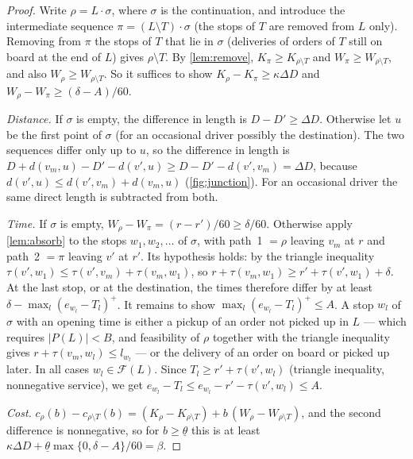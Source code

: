 \documentclass[11pt]{article}
\theoremstyle{definition}
\theoremstyle{remark}
\newcommand{\thl}{\underline{\theta}}
\begin{document}
\begin{proof}
Write $\rho=L\cdot\sigma$, where $\sigma$ is the continuation, and introduce the
intermediate sequence $\pi=(L\setminus T)\cdot\sigma$ (the stops of $T$ are
removed from $L$ only). Removing from $\pi$ the stops of $T$ that lie in
$\sigma$ (deliveries of orders of $T$ still on board at the end of $L$) gives
$\rho\setminus T$. By \cref{lem:remove}, $K_\pi\ge K_{\rho\setminus T}$ and
$W_\pi\ge W_{\rho\setminus T}$, and also $W_\rho\ge W_{\rho\setminus T}$. So it
suffices to show $K_\rho-K_\pi\ge\kappa\Delta D$ and $W_\rho-W_\pi\ge(\delta-A)/60$.

\emph{Distance.} If $\sigma$ is empty, the difference in length is
$D-D'\ge\Delta D$. Otherwise let $u$ be the first point of $\sigma$ (for an
occasional driver possibly the destination). The two sequences differ only up
to $u$, so the difference in length is
$D+d(v_m,u)-D'-d(v',u)\ge D-D'-d(v',v_m)=\Delta D$, because
$d(v',u)\le d(v',v_m)+d(v_m,u)$ (\cref{fig:junction}). For an occasional driver
the same direct length is subtracted from both.

\emph{Time.} If $\sigma$ is empty, $W_\rho-W_\pi=(r-r')/60\ge\delta/60$.
Otherwise apply \cref{lem:absorb} to the stops $w_1,w_2,\dots$ of $\sigma$, with
path~1 $=\rho$ leaving $v_m$ at $r$ and path~2 $=\pi$ leaving $v'$ at $r'$. Its
hypothesis holds: by the triangle inequality
$\tau(v',w_1)\le\tau(v',v_m)+\tau(v_m,w_1)$, so
$r+\tau(v_m,w_1)\ge r'+\tau(v',w_1)+\delta$. At the last stop, or at the
destination, the times therefore differ by at least
$\delta-\max_l(e_{w_l}-T_l)^+$. It remains to show
$\max_l(e_{w_l}-T_l)^+\le A$. A stop $w_l$ of $\sigma$ with an opening time is
either a pickup of an order not picked up in $L$ --- which requires
$|P(L)|<B$, and feasibility of $\rho$ together with the triangle inequality
gives $r+\tau(v_m,w_l)\le l_{w_l}$ --- or the delivery of an order on board or
picked up later. In all cases $w_l\in\mathcal F(L)$. Since
$T_l\ge r'+\tau(v',w_l)$ (triangle inequality, nonnegative service), we get
$e_{w_l}-T_l\le e_{w_l}-r'-\tau(v',w_l)\le A$.

\emph{Cost.} $c_\rho(b)-c_{\rho\setminus T}(b)=(K_\rho-K_{\rho\setminus T})
+b\,(W_\rho-W_{\rho\setminus T})$, and the second difference is nonnegative, so
for $b\ge\thl$ this is at least
$\kappa\Delta D+\thl\max\{0,\delta-A\}/60=\beta$.
\end{proof}
\end{document}
